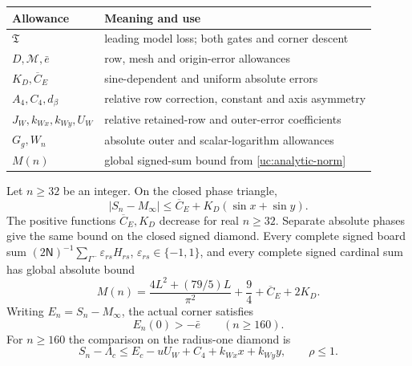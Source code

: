 \begin{center}\small
\begin{tabular}{@{}ll@{}}\toprule
Allowance & Meaning and use\\\midrule
$\mathfrak T$ & leading model loss; both gates and corner descent\\
$D,\mathcal M,\bar e$ & row, mesh and origin-error allowances\\
$K_D,\overline C_E$ & sine-dependent and uniform absolute errors\\
$A_4,C_4,d_\beta$ & relative row correction, constant and axis asymmetry\\
$J_W,k_{Wx},k_{Wy},U_W$ & relative retained-row and outer-error coefficients\\
$G_g,W_n$ & absolute outer and scalar-logarithm allowances\\
$M(n)$ & global signed-sum bound from \eqref{uc:analytic-norm}\\\bottomrule
\end{tabular}
\end{center}

\begin{theorem}\label{uc:finite-bounds}
Let $n\geq32$ be an integer. On the closed phase triangle,
\begin{equation}\label{uc:global-error}
 |S_n-M_\infty|\leq\overline C_E+K_D(\sin x+\sin y).
\end{equation}
The positive functions $\overline C_E,K_D$ decrease for real $n\geq32$.
Separate absolute phases give the same bound on the closed signed diamond.
Every complete signed board sum
$(2\mathsf N)^{-1}\sum_{\Gamma^-}\varepsilon_{rs}H_{rs}$,
$\varepsilon_{rs}\in\{-1,1\}$, and every complete signed cardinal sum
has global absolute bound
\begin{equation}\label{uc:analytic-norm}
 M(n)=\frac{4L^2+(79/5)L}{\pi^2}+\frac94+\overline C_E+2K_D.
\end{equation}
Writing $E_n=S_n-M_\infty$, the actual corner satisfies
\begin{equation}\label{uc:origin-lower}
 E_n(0)>-\bar e\qquad(n\geq160).
\end{equation}
For $n\geq160$ the comparison on the radius-one diamond is
\begin{equation}\label{uc:relative-comparison}
 S_n-\Lambda_c\leq E_c-uU_W+C_4+k_{Wx}x+k_{Wy}y,
 \qquad \rho\leq1.
\end{equation}
\end{theorem}

